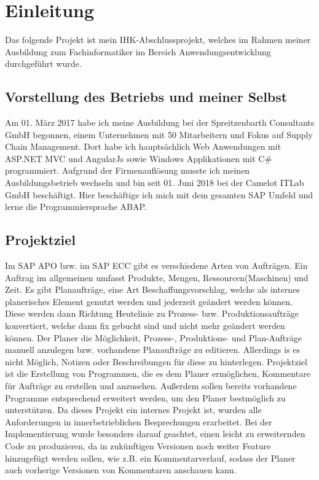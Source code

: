 \section{Einleitung}
\label{sec:Einleitung}
Das folgende Projekt ist mein IHK-Abschlussprojekt, welches im Rahmen meiner Ausbildung zum Fachinformatiker im Bereich Anwendungsentwicklung durchgeführt wurde.

\subsection{Vorstellung des Betriebs und meiner Selbst} 
\label{sec:Vorstellung des Betriebs und meiner Selbst}
Am 01. März 2017 habe ich meine Ausbildung bei der Spreitzenbarth Consultants GmbH begonnen, einem Unternehmen mit 50 Mitarbeitern und Fokus auf Supply Chain Management. Dort habe ich hauptsächlich Web Anwendungen mit ASP.NET MVC und AngularJs sowie Windows Applikationen mit C\# programmiert. Aufgrund der Firmenauflösung musste ich meinen Ausbildungsbetrieb wechseln und bin seit 01. Juni 2018 bei der Camelot ITLab GmbH beschäftigt. Hier beschäftige ich mich mit dem gesamten SAP Umfeld und lerne die Programmiersprache \ac{ABAP}.

\subsection{Projektziel} 
\label{sec:Projektziel}
Im SAP \ac{APO} bzw. im SAP \ac{ECC} gibt es verschiedene Arten von Aufträgen. Ein Auftrag im allgemeinen umfasst Produkte, Mengen, Ressourcen(Maschinen) und Zeit. Es gibt Planaufträge, eine Art Beschaffungsvorschlag, welche als internes planerisches Element genutzt werden und jederzeit geändert werden können. Diese werden dann Richtung Heutelinie zu  Prozess- bzw. Produktionsaufträge konvertiert, welche dann fix gebucht sind und nicht mehr geändert werden können. Der Planer die Möglichkeit, Prozess-, Produktions- und Plan-Aufträge manuell anzulegen bzw. vorhandene Planaufträge zu editieren. Allerdings is es nicht Möglich, Notizen oder Beschreibungen für diese zu hinterlegen. Projektziel ist die Erstellung von Programmen, die es dem Planer ermöglichen, Kommentare	für Aufträge zu erstellen und anzusehen. Außerdem sollen bereits vorhandene Programme entsprechend erweitert werden, um den Planer bestmöglich zu unterstützen. Da dieses Projekt ein internes Projekt ist, wurden alle Anforderungen in innerbetrieblichen Besprechungen erarbeitet. Bei der Implementierung wurde besonders darauf geachtet, einen leicht zu erweiternden Code zu produzieren, da in zukünftigen Versionen noch weiter Feature hinzugefügt werden sollen, wie z.B. ein Kommentarverlauf, sodass der Planer auch vorherige Versionen von Kommentaren anschauen kann. 

